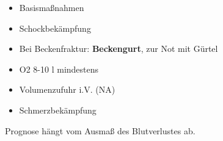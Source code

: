 \documentclass{article}
\begin{document}
\begin{itemize}
\item {\mdseries\color[rgb]{0.0,0.0,0.5019608}
Basisma{\ss}nahmen}

\item {\mdseries\color[rgb]{0.0,0.0,0.5019608}
Schockbek\"ampfung}

\item {\mdseries\color[rgb]{0.0,0.0,0.5019608}
Bei Beckenfraktur: \textbf{Beckengurt}, zur Not mit
G\"urtel%
%
}

\item {\mdseries\color[rgb]{0.0,0.0,0.5019608}
O2  8-10 l mindestens}

\item {\mdseries\color[rgb]{0.0,0.0,0.5019608}
Volumenzufuhr i.V. (NA)}

\item {\mdseries\color[rgb]{0.0,0.0,0.5019608}
Schmerzbek\"ampfung}

\end{itemize}
{\mdseries
Prognose h\"angt vom Ausma{\ss} des  Blutverlustes ab.}
\end{document}
